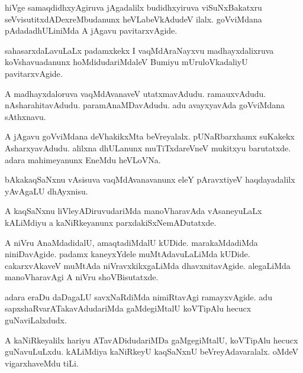 \documentclass{article}
\begin{document}
\begin{mn}%
hiVge samaqdidhxyAgiruva jAgadalilx budidhxyiruva viSuNxBakatxru 
seVvisutitxdADexreMbudanunx heVLabeVkAdudeV ilalx. goVviMdana pAdadadhULiniMda A jAgavu 
pavitarxvAgide.
\end{mn}

\begin{mn}%
sahasarxdaLavuLaLx padamxkekx I vaqMdAraNayxvu madhayxdalixruva koVshavuadanunx 
hoMdidudariMdaleV Bumiyu mUruloVkadaliyU pavitarxvAgide.
\end{mn}

\begin{mn}%
A madhayxdaloruva vaqMdAvanaveV utatxmavAdudu. ramauxvAdudu. nAsharahitavAdudu. 
paramAnaMDavAdudu. adu avayxyavAda goVviMdana sAthxnavu.
\end{mn}

\begin{mn}%
A jAgavu goVviMdana deVhakikxMta beVreyalalx. pUNaRbarxhamx suKakekx AsharxyavAdudu. 
alilxna dhULanunx muTiTxdareVneV mukitxyu barutatxde. adara mahimeyanunx EneMdu heVLoVNa.
\end{mn}

\begin{mn}%
bAkakaqSaNxnu vAsisuva vaqMdAvanavanunx eleY pAravxtiyeV haqdayadalilx yAvAgaLU dhAyxnisu.
\end{mn}

\begin{mn}%
A kaqSaNxnu liVleyADiruvudariMda manoVharavAda vAsaneyuLaLx kALiMdiyu a kaNiRkeyanunx 
parxdakiSxNemADutatxde.
\end{mn}

\begin{mn}%
A niVru AnaMdadidalU, amaqtadiMdalU kUDide. marakaMdadiMda niniDavAgide. padamx 
kaneyxYdele muMtAdavuLaLiMda kUDide. cakarxvAkaveV muMtAda niVravxkikxgaLiMda 
dhavxnitavAgide. alegaLiMda manoVharavAgi A niVru shoVBisutatxde.
\end{mn}

\begin{mn}%
adara eraDu daDagaLU savxNaRdiMda nimiRtavAgi ramayxvAgide. adu 
sapxshaRvarATakavAdudariMda gaMdegiMtalU koVTipAlu hecucx guNaviLalxdudx.
\end{mn}

\begin{mn}%
A kaNiRkeyalilx hariyu ATavADidudariMDa gaMgegiMtalU, koVTipAlu hecucx guNavuLuLxdu. 
kALiMdiya kaNiRkeyU kaqSaNxnU beVreyAdavaralalx. oMdeV vigarxhaveMdu tiLi.
\end{mn}
\end{document}
